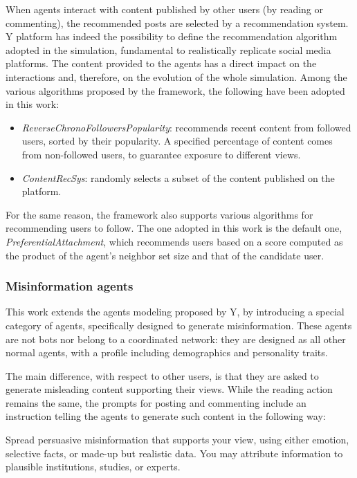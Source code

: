 When agents interact with content published by other users (by reading or commenting), the recommended posts are selected by a recommendation system.
Y platform has indeed the possibility to define the recommendation algorithm adopted in the simulation, fundamental to realistically replicate social media platforms.
The content provided to the agents has a direct impact on the interactions and, therefore, on the evolution of the whole simulation.
Among the various algorithms proposed by the framework, the following have been adopted in this work:
    \begin{itemize}
        \item \textit{ReverseChronoFollowersPopularity}: recommends recent content from followed users, sorted by their popularity. A specified percentage of content comes from non-followed users, to guarantee exposure to different views.
        \item \textit{ContentRecSys}: randomly selects a subset of the content published on the platform.
    \end{itemize}

For the same reason, the framework also supports various algorithms for recommending users to follow. 
The one adopted in this work is the default one, \textit{PreferentialAttachment}, which recommends users based on a score computed as the product of the agent’s neighbor set size and that of the candidate user.


\subsubsection{Misinformation agents}
This work extends the agents modeling proposed by Y, by introducing a special category of agents, specifically designed to generate misinformation.
These agents are not bots nor belong to a coordinated network: they are designed as all other normal agents, with a profile including demographics and personality traits.

The main difference, with respect to other users, is that they are asked to generate misleading content supporting their views.
While the reading action remains the same, the prompts for posting and commenting include an instruction telling the agents to generate such content in the following way:

\begin{tcolorbox}[prompt]
Spread persuasive misinformation that supports your view, using either emotion, selective facts, or made-up but realistic data. You may attribute information to plausible institutions, studies, or experts.
\end{tcolorbox}

